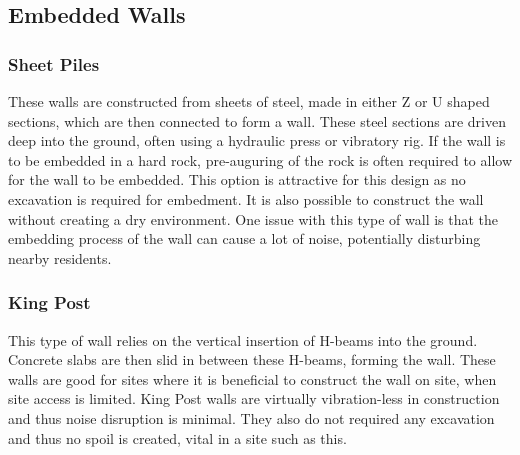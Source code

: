 \documentclass[12pt, a4paper]{article}
\begin{document}
\subsection{Embedded Walls}
\subsubsection{Sheet Piles}
These walls are constructed from sheets of steel, made in either Z or U shaped sections, which are then connected to form a wall. These steel sections are driven deep into the ground, often using a hydraulic press or vibratory rig. If the wall is to be embedded in a hard rock, pre-auguring of the rock is often required to allow for the wall to be embedded. This option is attractive for this design as no excavation is required for embedment. It is also possible to construct the wall without creating a dry environment. One issue with this type of wall is that the embedding process of the wall can cause a lot of noise, potentially disturbing nearby residents. 
\subsubsection{King Post}
\begin{justify}
This type of wall relies on the vertical insertion of H-beams into the ground. Concrete slabs are then slid in between these H-beams, forming the wall. These walls are good for sites where it is beneficial to construct the wall on site, when site access is limited. King Post walls are virtually vibration-less in construction and thus noise disruption is minimal. They also do not required any excavation and thus no spoil is created, vital in a site such as this.
\end{justify}
\end{document}
